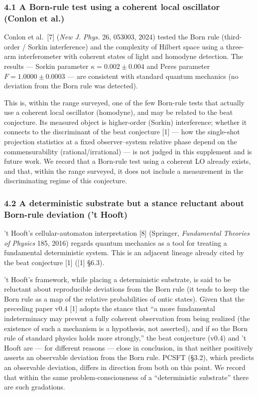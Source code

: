 \documentclass[
]{ltjsarticle}
\begin{document}
\subsubsection{4.1 A Born-rule test using a coherent local oscillator
(Conlon et
al.)}\label{a-born-rule-test-using-a-coherent-local-oscillator-conlon-et-al.}

Conlon et al.~{[}7{]} (\emph{New J. Phys.} 26, 053003, 2024) tested the
Born rule (third-order / Sorkin interference) and the complexity of
Hilbert space using a three-arm interferometer with coherent states of
light and homodyne detection. The results --- Sorkin parameter
\(\kappa = 0.002 \pm 0.004\) and Peres parameter
\(F = 1.0000 \pm 0.0003\) --- are consistent with standard quantum
mechanics (no deviation from the Born rule was detected).

This is, within the range surveyed, one of the few Born-rule tests that
actually use a coherent local oscillator (homodyne), and may be related
to the beat conjecture. Its measured object is higher-order (Sorkin)
interference; whether it connects to the discriminant of the beat
conjecture {[}1{]} --- how the single-shot projection statistics at a
fixed observer--system relative phase depend on the commensurability
(rational/irrational) --- is not judged in this supplement and is future
work. We record that a Born-rule test using a coherent LO already
exists, and that, within the range surveyed, it does not include a
measurement in the discriminating regime of this conjecture.

\subsubsection{4.2 A deterministic substrate but a stance reluctant
about Born-rule deviation ('t
Hooft)}\label{a-deterministic-substrate-but-a-stance-reluctant-about-born-rule-deviation-t-hooft}

't Hooft's cellular-automaton interpretation {[}8{]} (Springer,
\emph{Fundamental Theories of Physics} 185, 2016) regards quantum
mechanics as a tool for treating a fundamental deterministic system.
This is an adjacent lineage already cited by the beat conjecture {[}1{]}
({[}1{]} §6.3).

't Hooft's framework, while placing a deterministic substrate, is said
to be reluctant about reproducible deviations from the Born rule (it
tends to keep the Born rule as a map of the relative probabilities of
ontic states). Given that the preceding paper v0.4 {[}1{]} adopts the
stance that ``a more fundamental indeterminacy may prevent a fully
coherent observation from being realized (the existence of such a
mechanism is a hypothesis, not asserted), and if so the Born rule of
standard physics holds more strongly,'' the beat conjecture (v0.4) and
't Hooft are --- for different reasons --- close in conclusion, in that
neither positively asserts an observable deviation from the Born rule.
PCSFT (§3.2), which predicts an observable deviation, differs in
direction from both on this point. We record that within the same
problem-consciousness of a ``deterministic substrate'' there are such
gradations.
\end{document}
